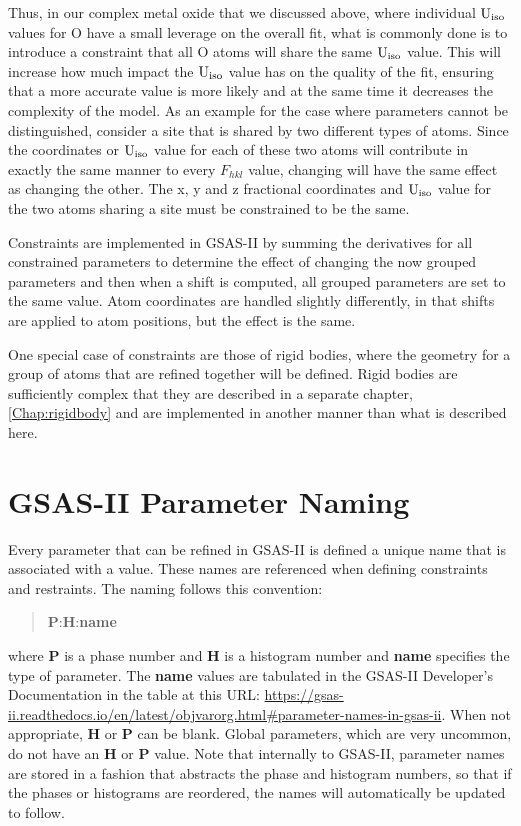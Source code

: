 Thus, in our complex metal oxide that we discussed above, where individual $\rm U_{iso}$ values for O have a small leverage on the overall fit, what is commonly done is to introduce a constraint that all O atoms will share the same $\rm U_{iso}$ value. This will increase how much impact the $\rm U_{iso}$ value has on the quality of the fit, ensuring that a more accurate value is more likely and at the same time it decreases the complexity of the model. As an example for the case where parameters cannot be distinguished, consider a site that is shared by two different types of atoms. Since the coordinates or $\rm U_{iso}$ value for each of these two atoms will contribute in exactly the same manner to every $F_{hkl}$ value, changing will have the same effect as changing the other. The x, y and z fractional coordinates and $\rm U_{iso}$ value for the two atoms sharing a site must be constrained to be the same. 

Constraints are implemented in GSAS-II by summing the derivatives for all constrained parameters to determine the effect of changing the now grouped parameters and then when a shift is computed, all grouped parameters are set to the same value. Atom coordinates are handled slightly differently, in that shifts are applied to atom positions, but the effect is the same.

One special case of constraints are those of rigid bodies, where the geometry for a group of atoms that are refined together will be defined. Rigid bodies are sufficiently complex that they are described in a separate chapter, \ref{Chap:rigidbody} and are implemented in another manner than what is described here. 

\section{GSAS-II Parameter Naming}\label{ref:paramname}

Every parameter that can be refined in GSAS-II is defined a unique name that is associated with a value. These names are referenced when defining constraints and restraints. The naming follows this convention: 
\begin{quote}
 \textbf{P}:\textbf{H}:\textbf{name}    
\end{quote}
where \textbf{P} is a phase number and \textbf{H} is a histogram number and \textbf{name} specifies the type of parameter. The \textbf{name} values are tabulated in the GSAS-II Developer's Documentation in the table at this URL: \url{https://gsas-ii.readthedocs.io/en/latest/objvarorg.html\#parameter-names-in-gsas-ii}.
When not appropriate, \textbf{H} or \textbf{P} can be blank. Global parameters, which are very uncommon, do not have an \textbf{H} or \textbf{P} value. Note that internally to GSAS-II, parameter names are stored in a fashion that abstracts the phase and histogram numbers, so that if the phases or histograms are reordered, the names will automatically be updated to follow. 

